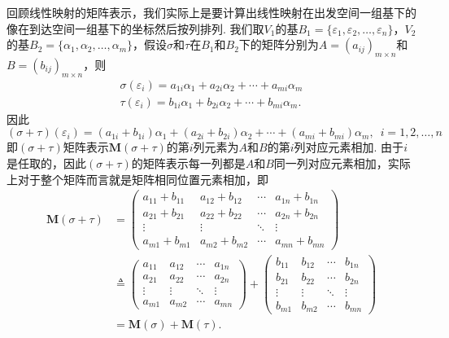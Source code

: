 回顾线性映射的矩阵表示，我们实际上是要计算出线性映射在出发空间一组基下的像在到达空间一组基下的坐标然后按列排列. 我们取$V_1$的基$B_1=\{\varepsilon_1,\varepsilon_2,\ldots,\varepsilon_n\}$，$V_2$的基$B_2=\{\alpha_1,\alpha_2,\ldots,\alpha_m\}$，假设$\sigma$和$\tau$在$B_1$和$B_2$下的矩阵分别为$A=(a_{ij})_{m\times n}$和$B=(b_{ij})_{m\times n}$，则
\begin{gather*}
    \sigma(\varepsilon_i)=a_{1i}\alpha_1+a_{2i}\alpha_2+\cdots+a_{mi}\alpha_m \\
    \tau(\varepsilon_i)=b_{1i}\alpha_1+b_{2i}\alpha_2+\cdots+b_{mi}\alpha_m.
\end{gather*}
因此
\[(\sigma+\tau)(\varepsilon_i)=(a_{1i}+b_{1i})\alpha_1+(a_{2i}+b_{2i})\alpha_2+\cdots+(a_{mi}+b_{mi})\alpha_m,\enspace i=1,2,\ldots,n\]
即$(\sigma+\tau)$矩阵表示$\mathbf{M}(\sigma+\tau)$的第$i$列元素为$A$和$B$的第$i$列对应元素相加. 由于$i$是任取的，因此$(\sigma+\tau)$的矩阵表示每一列都是$A$和$B$同一列对应元素相加，实际上对于整个矩阵而言就是矩阵相同位置元素相加，即
\begin{align*}
    \mathbf{M}(\sigma+\tau) & =\begin{pmatrix}
                                   a_{11}+b_{11} & a_{12}+b_{12} & \cdots & a_{1n}+b_{1n} \\
                                   a_{21}+b_{21} & a_{22}+b_{22} & \cdots & a_{2n}+b_{2n} \\
                                   \vdots        & \vdots        & \ddots & \vdots        \\
                                   a_{m1}+b_{m1} & a_{m2}+b_{m2} & \cdots & a_{mn}+b_{mn}
                               \end{pmatrix}     \\
                            & \triangleq\begin{pmatrix}
                                            a_{11} & a_{12} & \cdots & a_{1n} \\
                                            a_{21} & a_{22} & \cdots & a_{2n} \\
                                            \vdots & \vdots & \ddots & \vdots \\
                                            a_{m1} & a_{m2} & \cdots & a_{mn}
                                        \end{pmatrix} + \begin{pmatrix}
                                                            b_{11} & b_{12} & \cdots & b_{1n} \\
                                                            b_{21} & b_{22} & \cdots & b_{2n} \\
                                                            \vdots & \vdots & \ddots & \vdots \\
                                                            b_{m1} & b_{m2} & \cdots & b_{mn}
                                                        \end{pmatrix} \\
                            & =\mathbf{M}(\sigma)+\mathbf{M}(\tau).
\end{align*}
